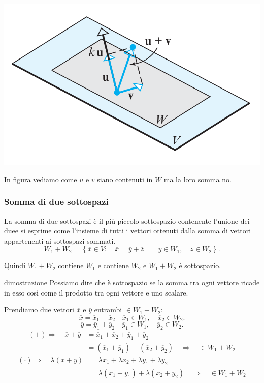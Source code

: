 \documentclass[x11names]{article}
\begin{document}
\begin{center}
\includegraphics[scale=0.25]{figures/subspace.png}
\end{center}
In figura vediamo come $u$ e $v$ siano contenuti in $W$ ma la loro somma no.
\subsubsection{Somma di due sottospazi}
La somma di due sottospazi è il più piccolo sottospazio contenente l'unione dei duee si esprime come l'insieme di tutti i vettori ottenuti dalla somma di vettori appartenenti ai sottospazi sommati.
\[
W_1 + W_2  = \left\{\overline{x} \in V: \quad \overline{x} = \overline{y}+\overline{z}  \qquad y \in W_1, \quad z \in W_2\right\}
.\] 

Quindi $W_1 + W_2$ contiene $W_1$ e contiene $W_2$ e $W_1 + W_2$ è sottospazio.
\begin{es}{dimostrazione}
Possiamo dire che è sottospazio se la somma tra ogni vettore ricade in esso così come il prodotto tra ogni vettore e uno scalare.

Prendiamo due vettori $\overline{x}$ e $\overline{y}$ entrambi $\in W_1 + W_2$:
\[
\overline{x} = \overline{x}_{1} + \overline{x}_{2} \quad \overline{x}_1 \in W_1, \quad \overline{x}_{2} \in W_2
.\] 
\[
\overline{y} = \overline{y}_{1} + \overline{y}_{2} \quad \overline{y}_1 \in W_1, \quad \overline{y}_{2} \in W_2
.\] 
\begin{align*}
	\left(+\right)\Rightarrow \quad \overline{x} + \overline{y} &= \overline{x}_{1} + \overline{x}_{2} + \overline{y}_{1} + \overline{y}_{2} \\
						      &= \left(\overline{x}_{1} + \overline{y}_{1}\right) + \left(\overline{x}_{2}+\overline{y}_{2}\right) \quad \Rightarrow \quad \in W_1 + W_2 
\end{align*}
\begin{align*}
	\left(\cdot\right) \Rightarrow \quad \lambda\left(\overline{x}+\overline{y}\right) &= \lambda \overline{x}_{1} + \lambda \overline{x}_{2} + \lambda \overline{y}_{1} + \lambda \overline{y}_{2} \\
						      &= \lambda\left(\overline{x}_{1} + \overline{y}_{1}\right) + \lambda\left(\overline{x}_{2}+\overline{y}_{2}\right) \quad \Rightarrow \quad \in W_1 + W_2
\end{align*}
\end{es}
\end{document}
